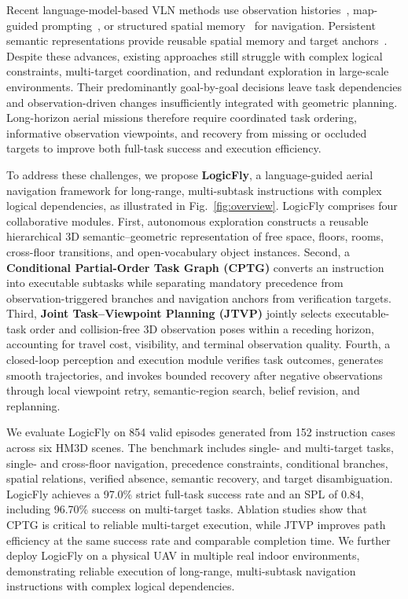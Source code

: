 \documentclass[letterpaper,10pt,journal]{IEEEtran}
\begin{document}
Recent language-model-based VLN methods use observation histories~\cite{zhou2024navgpt}, map-guided prompting~\cite{chen2024mapgpt}, or structured spatial memory~\cite{jiang2025spatialgpt} for navigation. Persistent semantic representations provide reusable spatial memory and target anchors~\cite{huang2023vlmaps,gu2024conceptgraphs,werby2024hovsg}. Despite these advances, existing approaches still struggle with complex logical constraints, multi-target coordination, and redundant exploration in large-scale environments. Their predominantly goal-by-goal decisions leave task dependencies and observation-driven changes insufficiently integrated with geometric planning. Long-horizon aerial missions therefore require coordinated task ordering, informative observation viewpoints, and recovery from missing or occluded targets to improve both full-task success and execution efficiency.

To address these challenges, we propose \textbf{LogicFly}, a language-guided aerial navigation framework for long-range, multi-subtask instructions with complex logical dependencies, as illustrated in Fig.~\ref{fig:overview}. LogicFly comprises four collaborative modules. First, autonomous exploration constructs a reusable hierarchical 3D semantic--geometric representation of free space, floors, rooms, cross-floor transitions, and open-vocabulary object instances. Second, a \textbf{Conditional Partial-Order Task Graph (CPTG)} converts an instruction into executable subtasks while separating mandatory precedence from observation-triggered branches and navigation anchors from verification targets. Third, \textbf{Joint Task--Viewpoint Planning (JTVP)} jointly selects executable-task order and collision-free 3D observation poses within a receding horizon, accounting for travel cost, visibility, and terminal observation quality. Fourth, a closed-loop perception and execution module verifies task outcomes, generates smooth trajectories, and invokes bounded recovery after negative observations through local viewpoint retry, semantic-region search, belief revision, and replanning.

We evaluate LogicFly on 854 valid episodes generated from 152 instruction cases across six HM3D scenes. The benchmark includes single- and multi-target tasks, single- and cross-floor navigation, precedence constraints, conditional branches, spatial relations, verified absence, semantic recovery, and target disambiguation. LogicFly achieves a 97.0\% strict full-task success rate and an SPL of 0.84, including 96.70\% success on multi-target tasks. Ablation studies show that CPTG is critical to reliable multi-target execution, while JTVP improves path efficiency at the same success rate and comparable completion time. We further deploy LogicFly on a physical UAV in multiple real indoor environments, demonstrating reliable execution of long-range, multi-subtask navigation instructions with complex logical dependencies.
\end{document}
